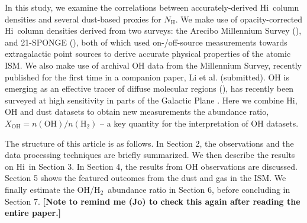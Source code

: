\documentclass[preprint]{emulateapj}
\def\h2{H$_2$}
\def\hi{H{\sc i}}
\def\xco{$X_\mathrm{CO}$}
\begin{document}
In this study, we examine the correlations between accurately-derived \hi\ column densities and several dust-based proxies for $N_\mathrm{H}$. %
We make use of opacity-corrected \hi\ column densities derived from two surveys: the Arecibo Millennium Survey (\citealt{Heiles2003b}), and 21-SPONGE (\citealt{Murray2015}), both of which used on-/off-source measurements towards extragalactic point sources to derive accurate physical properties of the atomic ISM. We also make use of archival OH data from the Millennium Survey, recently published for the first time in a companion paper, Li et al. (submitted). %
OH is emerging as an effective tracer of diffuse molecular regions (\citealt{Wannier93, Liszt1996, Barriault2010, Allen2012, Allen2015, Xu2016, Li2017}), has recently been surveyed at high sensitivity in parts of the Galactic Plane \citep{Dawson2014, Bihr2015}. Here we combine \hi, OH and dust datasets to obtain new measurements the abundance ratio, $X_\mathrm{OH}=n(\mathrm{OH})/n(\mathrm{H}_2)$ -- a key quantity for the interpretation of OH datasets.  %



The structure of this article is as follows. In Section 2, the observations and the data processing techniques are briefly summarized. We then describe the results on \hi\ in Section 3. In Section 4, the results from OH observations are discussed. Section 5 shows the featured outcomes from the dust and gas in the ISM. We finally estimate the OH/\h2\ abundance ratio in Section 6, before concluding in Section 7. \textbf{\color{magenta}[Note to remind me (Jo) to check this again after reading the entire paper.]}
\end{document}
